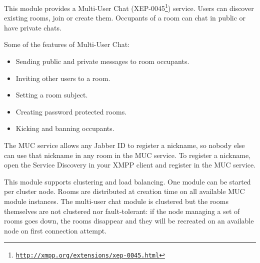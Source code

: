 \documentclass[a4paper,10pt]{book}
\gdef\footahref#1#2{#2\footnote{\href{#1}{\texttt{#1}}}}
\newcommand{\txepref}[2]{\footahref{http://xmpp.org/extensions/xep-#1.html}{#2}}
\newcommand{\xepref}[1]{\txepref{#1}{XEP-#1}}
\begin{document}
This module provides a Multi-User Chat (\xepref{0045}) service.
Users can discover existing rooms, join or create them.
Occupants of a room can chat in public or have private chats.

Some of the features of Multi-User Chat:
\begin{itemize}
\item Sending public and private messages to room occupants.
\item Inviting other users to a room.
\item Setting a room subject.
\item Creating password protected rooms.
\item Kicking and banning occupants.
\end{itemize}

The MUC service allows any Jabber ID to register a nickname,
so nobody else can use that nickname in any room in the MUC service.
To register a nickname, open the Service Discovery in your
XMPP client and register in the MUC service.

This module supports clustering and load
balancing. One module can be started per cluster node. Rooms are
distributed at creation time on all available MUC module
instances. The multi-user chat module is clustered but the rooms
themselves are not clustered nor fault-tolerant: if the node managing a
set of rooms goes down, the rooms disappear and they will be recreated
on an available node on first connection attempt.
\end{document}
